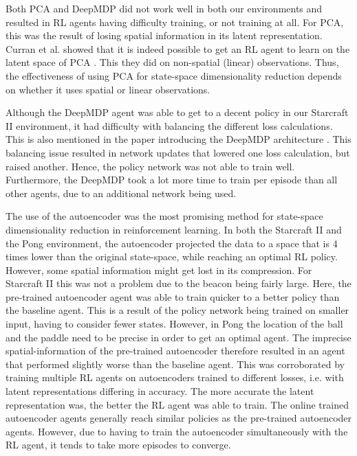 Both PCA and DeepMDP did not work well in both our environments and resulted in RL agents having difficulty training, or not training at all. For PCA, this was the result of losing spatial information in its latent representation. Curran et al. showed that it is indeed possible to get an RL agent to learn on the latent space of PCA \cite{mario}. This they did on non-spatial (linear) observations. Thus, the effectiveness of using PCA for state-space dimensionality reduction depends on whether it uses spatial or linear observations.

Although the DeepMDP agent was able to get to a decent policy in our Starcraft II environment, it had difficulty with balancing the different loss calculations. This is also mentioned in the paper introducing the DeepMDP architecture \cite{deepmdp}. This balancing issue resulted in network updates that lowered one loss calculation, but raised another. Hence, the policy network was not able to train well. Furthermore, the DeepMDP took a lot more time to train per episode than all other agents, due to an additional network being used.

The use of the autoencoder was the most promising method for state-space dimensionality reduction in reinforcement learning. In both the Starcraft II and the Pong environment, the autoencoder projected the data to a space that is 4 times lower than the original state-space, while reaching an optimal RL policy. However, some spatial information might get lost in its compression. For Starcraft II this was not a problem due to the beacon being fairly large. Here, the pre-trained autoencoder agent was able to train quicker to a better policy than the baseline agent. This is a result of the policy network being trained on smaller input, having to consider fewer states. However, in Pong the location of the ball and the paddle need to be precise in order to get an optimal agent. The imprecise spatial-information of the pre-trained autoencoder therefore resulted in an agent that performed slightly worse than the baseline agent. This was corroborated  by training multiple RL agents on autoencoders trained to different losses, i.e. with latent representations differing in accuracy. The more accurate the latent representation was, the better the RL agent was able to train. The online trained autoencoder agents generally reach similar policies as the pre-trained autoencoder agents. However, due to having to train the autoencoder simultaneously with the RL agent, it tends to take more episodes to converge. 

